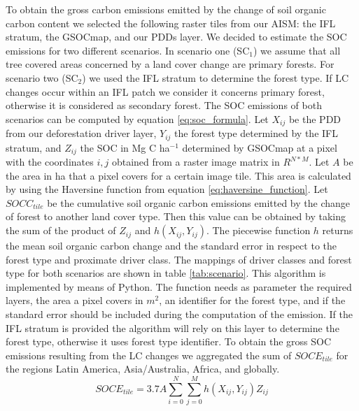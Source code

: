 		To obtain the gross carbon emissions emitted by the change of soil organic carbon content we selected the following raster tiles from our \ac{AISM}: the \ac{IFL} stratum, the \ac{GSOCmap}, and our \acp{PDD} layer. We decided to estimate the \ac{SOC} emissions for two different scenarios. In scenario one (SC$_1$) we assume that all tree covered areas concerned by a land cover change are primary forests. For scenario two (SC$_2$) we used the \ac{IFL} stratum to determine the forest type. If \ac{LC} changes occur within an \ac{IFL} patch we consider it concerns primary forest, otherwise it is considered as secondary forest. The \ac{SOC} emissions of both scenarios can be computed by equation \ref{eq:soc_formula}. Let $X_{ij}$ be the \ac{PDD} from our deforestation driver layer, $Y_{ij}$ the forest type determined by the \ac{IFL} stratum, and $Z_{ij}$ the \ac{SOC} in Mg C ha$^{-1}$ determined by \ac{GSOCmap} at a pixel with the coordinates $i,j$ obtained from a raster image matrix in $R^{N*M}$. Let $A$ be the area in ha that a pixel covers for a certain image tile. This area is calculated by using the Haversine function from equation \ref{eq:haversine_function}. Let $SOCC_{tile}$ be the cumulative soil organic carbon emissions emitted by the change of forest to another land cover type. Then this value can be obtained by taking the sum of the product of $Z_{ij}$ and $h(X_{ij}, Y_{ij})$. The piecewise function $h$ returns the mean soil organic carbon change and the standard error in respect to the forest type and proximate driver class. The mappings of driver classes and forest type for both scenarios are shown in table \ref{tab:scenario}. This algorithm is implemented by means of Python. The function needs as parameter the required layers, the area a pixel covers in $m^2$, an identifier for the forest type, and if the standard error should be included during the computation of the emission. If the \ac{IFL} stratum is provided the algorithm will rely on this layer to determine the forest type, otherwise it uses forest type identifier. To obtain the gross \ac{SOC} emissions resulting from the \ac{LC} changes we aggregated the sum of $SOCE_{tile}$ for the regions Latin America, Asia/Australia, Africa, and globally. 
		\begin{equation}
		\label{eq:soc_formula}
			SOCE_{tile} = 3.7A\displaystyle\sum_{i=0}^{N}\displaystyle\sum_{j=0}^{M} h(X_{ij}, Y_{ij})Z_{ij}
		\end{equation}

